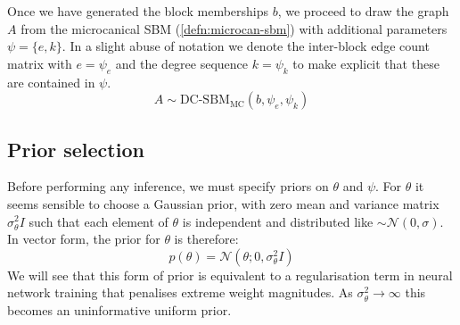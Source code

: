 \documentclass{article}
\newcommand{\Gaussian}{\mathcal{N}}
\begin{document}
Once we have generated the block memberships $b$, we proceed to draw the graph $A$ from the microcanical SBM (\ref{defn:microcan-sbm}) with additional parameters $\psi = \{e, k\}$. In a slight abuse of notation we denote the inter-block edge count matrix with $e = \psi_e$ and the degree sequence $k = \psi_k$ to make explicit that these are contained in $\psi$.
%
\begin{equation}
	A \sim \textrm{DC-SBM}_{\textrm{MC}} (b, \psi_e, \psi_k)
\end{equation}


\subsection{Prior selection}

Before performing any inference, we must specify priors on $\theta$ and $\psi$. For $\theta$ it seems sensible to choose a Gaussian prior, with zero mean and variance matrix $\sigma^2_\theta I$ such that each element of $\theta$ is independent and distributed like $\sim \Gaussian(0, \sigma)$. In vector form, the prior for $\theta$ is therefore:
%
\begin{equation}
	p(\theta) = \Gaussian \left( \theta ; 0, \sigma_\theta^2 I \right)
\end{equation}
%
We will see that this form of prior is equivalent to a regularisation term in neural network training that penalises extreme weight magnitudes. As $\sigma_\theta^2 \rightarrow \infty$ this becomes an uninformative uniform prior.
\end{document}
